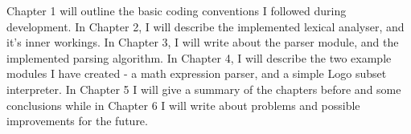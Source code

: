 Chapter 1 will outline the basic coding conventions I followed during development. In Chapter 2, I will describe the implemented lexical analyser, and it's inner workings. In Chapter 3, I will write about the parser module, and the implemented parsing algorithm. In Chapter 4, I will describe the two example modules I have created - a math expression parser, and a simple Logo subset interpreter. In Chapter 5 I will give a summary of the chapters before and some conclusions while in Chapter 6 I will write about problems and possible improvements for the future.
